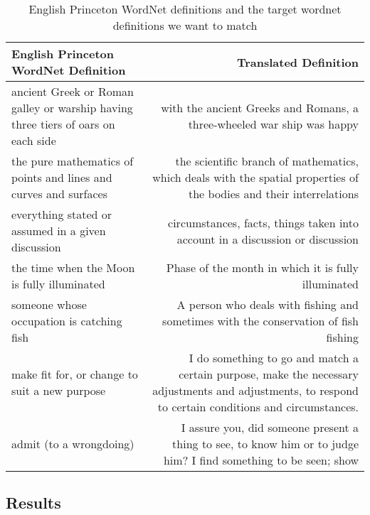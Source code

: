 \begin{table}[htbp]
    \centering
    \begin{tabulary}{\textwidth}{LR}
        \toprule%
        \textbf{English Princeton WordNet Definition} & \textbf{Translated Definition} \\
        \midrule%
        ancient Greek or Roman galley or warship having three tiers of oars on each side & with the ancient Greeks and Romans, a three-wheeled war ship was happy \\
        \cmidrule(rl){1-2}
        the pure mathematics of points and lines and curves and surfaces & the scientific branch of mathematics, which deals with the spatial properties of the bodies and their interrelations \\
        \cmidrule(rl){1-2}
        everything stated or assumed in a given discussion & circumstances, facts, things taken into account in a discussion or discussion \\
        \cmidrule(rl){1-2}
        the time when the Moon is fully illuminated & Phase of the month in which it is fully illuminated \\
        \cmidrule(rl){1-2}
        someone whose occupation is catching fish & A person who deals with fishing and sometimes with the conservation of fish fishing \\
        \cmidrule(rl){1-2}
        make fit for, or change to suit a new purpose & I do something to go and match a certain purpose, make the necessary adjustments and adjustments, to respond to certain conditions and circumstances. \\
        \cmidrule(rl){1-2}
        admit (to a wrongdoing) & I assure you, did someone present a thing to see, to know him or to judge him? I find something to be seen; show \\
        \bottomrule %
    \end{tabulary}%
    \caption{English Princeton WordNet definitions and the target wordnet definitions we want to match}%
    \label{tab:pwn_translated}
\end{table}

\subsection{Results}%
\label{sub:results}

